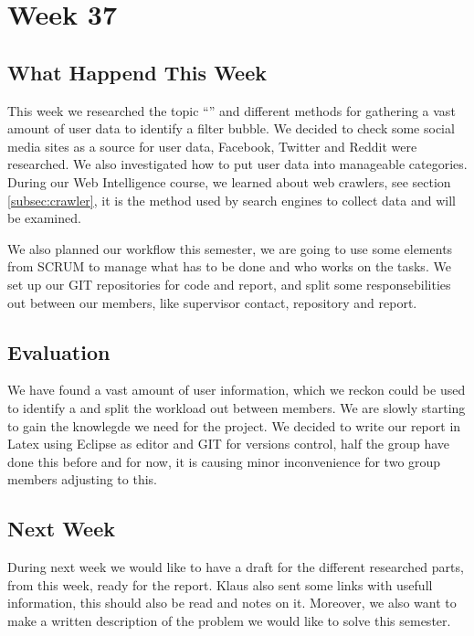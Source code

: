 \section*{Week 37}
\subsection*{What Happend This Week}
This week we researched the topic  ``\fb'' and different methods for gathering a
vast amount of user data to identify a filter bubble. We decided to check some
social media sites as a source for user data, Facebook, Twitter and Reddit were
researched. We also investigated how to put user data into manageable
categories. During our Web Intelligence course, we learned about web crawlers,
see section \ref{subsec:crawler}, it is the method used by search engines to
collect data and will be examined.

We also planned our workflow this semester, we are going to use some elements
from SCRUM to manage what has to be done and who works on the tasks. We set up
our GIT repositories for code and report, and split some responsebilities out
between our members, like supervisor contact, repository and report.

\subsection*{Evaluation}
We have found a vast amount of user information, which we reckon could be used
to identify a \fb and split the workload out between members. We are slowly
starting to gain the knowlegde we need for the project. We decided to write our
report in Latex using Eclipse as editor and GIT for versions control, half the
group have done this before and for now, it is causing minor inconvenience for
two group members adjusting to this.

\subsection*{Next Week}
During next week we would like to have a draft for the different researched
parts, from this week, ready for the report. Klaus also sent some links with
usefull information, this should also be read and notes on it. Moreover, we also
want to make a written description of the problem we would like to solve this
semester.